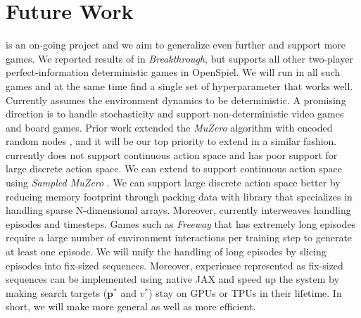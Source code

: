 \chapter{Future Work}
\moozi is an on-going project and we aim to generalize \moozi even further and support more games.
We reported results of \moozi in \textit{Breakthrough}, but \moozi supports all other two-player perfect-information deterministic games in OpenSpiel.
We will run \moozi in all such games and at the same time find a single set of hyperparameter that works well.
Currently \moozi assumes the environment dynamics to be deterministic.
A promising direction is to handle stochasticity and support non-deterministic video games and board games.
Prior work extended the \textit{MuZero} algorithm with encoded random nodes \cite{VectorQuantizedModels_Ozair.Li.ea_2021,PLANNINGSTOCHASTICENVIRONMENTS_Antonoglou.Schrittwieser.ea_2022}, and it will be our top priority to extend \moozi in a similar fashion.
\moozi currently does not support continuous action space and has poor support for large discrete action space.
We can extend \moozi to support continuous action space using \textit{Sampled MuZero} \cite{LearningPlanningComplex_Hubert.Schrittwieser.ea_2021}.
We can support large discrete action space better by reducing memory footprint through packing data with library that specializes in handling sparse N-dimensional arrays.
Moreover, \moozi currently interweaves handling episodes and timesteps.
Games such as \textit{Freeway} that has extremely long episodes require a large number of environment interactions per training step to generate at least one episode.
We will unify the handling of long episodes by slicing episodes into fix-sized sequences.
Moreover, experience represented as fix-sized sequences can be implemented using native JAX and speed up the system by making search targets (\(\mathbf{p}^{*}\) and $v^{*}$) stay on GPUs or TPUs in their lifetime.
In short, we will make \moozi more general as well as more efficient.